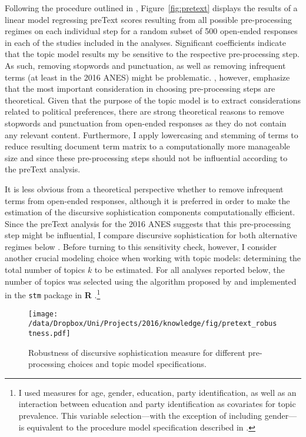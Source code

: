Following the procedure outlined in \citet{denny2018text}, Figure~\ref{fig:pretext} displays the results of a linear model regressing preText scores resulting from all possible pre-processing regimes on each individual step for a random subset of 500 open-ended responses in each of the studies included in the analyses. Significant coefficients indicate that the topic model results my be sensitive to the respective pre-processing step. As such, removing stopwords and punctuation, as well as removing infrequent terms (at least in the 2016 ANES) might be problematic. \citet{denny2018text}, however, emphasize that the most important consideration in choosing pre-processing steps are theoretical. Given that the purpose of the topic model is to extract considerations related to political preferences, there are strong theoretical reasons to remove stopwords and punctuation from open-ended responses as they do not contain any relevant content. Furthermore, I apply lowercasing and stemming of terms to reduce resulting document term matrix to a computationally more manageable size and since these pre-processing steps should not be influential according to the preText analysis.

It is less obvious from a theoretical perspective whether to remove infrequent terms from open-ended responses, although it is preferred in order to make the estimation of the discursive sophistication components computationally efficient. Since the preText analysis for the 2016 ANES suggests that this pre-processing step might be influential, I compare discursive sophistication for both alternative regimes below \citep[c.f.,][]{denny2018text}. Before turning to this sensitivity check, however, I consider another crucial modeling choice when working with topic models: determining the total number of topics $k$ to be estimated. For all analyses reported below, the number of topics was selected using the algorithm proposed by \citet{lee2014low} and implemented in the \texttt{stm} package in \textbf{R} \citep{roberts2014stm}.\footnote{I used measures for age, gender, education, party identification, as well as an interaction between education and party identification as covariates for topic prevalence. This variable selection---with the exception of including gender---is equivalent to the procedure model specification described in \citet{roberts2014structural}.} 

\begin{figure}[h]\centering
\texttt{[image: /data/Dropbox/Uni/Projects/2016/knowledge/fig/pretext\_robustness.pdf]}
\caption{Robustness of discursive sophistication measure for different pre-processing choices and topic model specifications.}\label{fig:pretext_robustness}
\end{figure}

